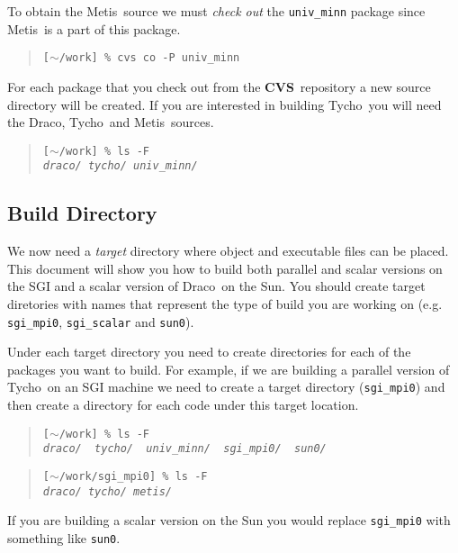 \documentclass[10pt]{nmemo}
\newcommand{\comp}[1]{\normalfont\normalsize\texttt{#1}}
\newcommand{\draco}{{\normalfont\sffamily Draco}}
\newcommand{\tycho}{{\normalfont\sffamily Tycho}}
\newcommand{\metis}{{\normalfont\sffamily Metis}}
\newcommand{\cvs}{{\normalfont\bfseries CVS}}
\begin{document}
To obtain the \metis\ source we must \emph{check out} the
\comp{univ\_minn} package since \metis\ is a part of this package.

\footnotesize
\begin{verse}
\texttt{[$\sim$/work] \% cvs co -P univ\_minn}
\end{verse}
\normalsize

For each package that you check out from the \cvs\ repository a new
source directory will be created.  If you are interested in building
\tycho\ you will need the \draco, \tycho\ and \metis\ sources.

\footnotesize
\begin{verse}
\texttt{[$\sim$/work] \% ls -F \\
\emph{draco/  tycho/  univ\_minn/}}
\end{verse}
\normalsize

\subsection{Build Directory}

We now need a \emph{target} directory where object and executable
files can be placed.  This document will show you how to build both
parallel and scalar versions on the SGI and a scalar version of
\draco\ on the Sun.  You should create target diretories with names
that represent the type of build you are working on
(e.g. \comp{sgi\_mpi0}, \comp{sgi\_scalar} and \comp{sun0}).

Under each target directory you need to create directories for each of
the packages you want to build.  For example, if we are building a
parallel version of \tycho\ on an SGI machine we need to create a
target directory (\comp{sgi\_mpi0}) and then create a directory for
each code under this target location.

\footnotesize
\begin{verse}
\texttt{[$\sim$/work] \% ls -F \\
\emph{draco/\ \ tycho/\ \ univ\_minn/\ \ sgi\_mpi0/\ \ sun0/ }}
\end{verse}

\begin{verse}
\texttt{[$\sim$/work/sgi\_mpi0] \% ls -F \\
\emph{draco/  tycho/  metis/}}
\end{verse}
\normalsize

If you are building a scalar version on the Sun you would replace
\comp{sgi\_mpi0} with something like \comp{sun0}.
\end{document}
